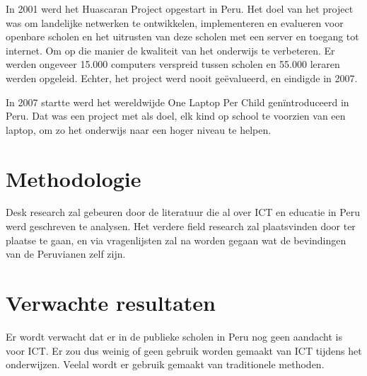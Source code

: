 In 2001 werd het Huascaran Project opgestart in Peru. Het doel van het project was om landelijke netwerken te ontwikkelen, implementeren en evalueren voor openbare scholen en het uitrusten van deze scholen met een server en toegang tot internet. Om op die manier de kwaliteit van het onderwijs te verbeteren. Er werden ongeveer 15.000 computers verspreid tussen scholen en 55.000 leraren werden opgeleid. Echter, het project werd nooit ge\"evalueerd, en eindigde in 2007.  \autocite{SALAS-PILCO2014}

In 2007 startte werd het wereldwijde One Laptop Per Child gen\"introduceerd in Peru. Dat was een project met als doel, elk kind op school te voorzien van een laptop, om zo het onderwijs naar een hoger niveau te helpen.
 

\section{Methodologie}
\label{sec:methodologie}
Desk research zal gebeuren door de literatuur die al over ICT en educatie in Peru werd geschreven te analysen. Het verdere field research zal plaatsvinden door ter plaatse te gaan, en via vragenlijsten zal na worden gegaan wat de bevindingen van de Peruvianen zelf zijn.
 

\section{Verwachte resultaten}
\label{sec:verwachte_resultaten}
Er wordt verwacht dat er in de publieke scholen in Peru nog  geen aandacht is voor ICT. Er zou dus weinig of geen gebruik worden gemaakt van ICT tijdens het onderwijzen. Veelal wordt er gebruik gemaakt van traditionele methoden.

